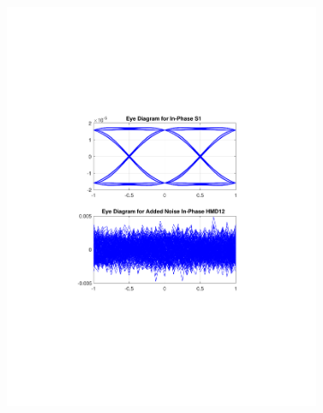 \begin{refsection}
\begin{figure}[H]
\begin{minipage}{\linewidth}
\begin{subfigure}{.45\textwidth}
		\includegraphics[clip, trim=5cm 7cm 5cm 7cm, width=\textwidth]{./sdf/m_qam_system/figures/eyes/if_n_nmf_60_60_rc_09.pdf}
	\end{subfigure}
	\begin{subfigure}{.45\textwidth}
		\centering

\end{subfigure}
\end{minipage}
\end{figure}
\end{refsection}
